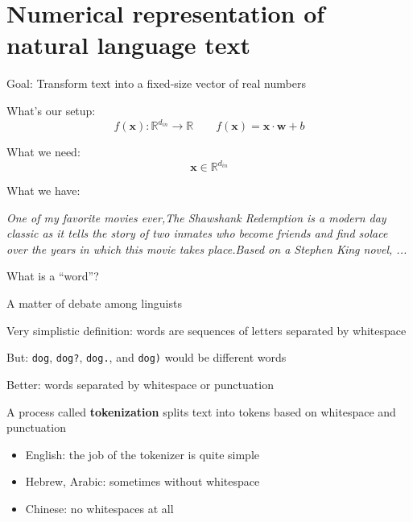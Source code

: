 \documentclass[12pt,aspectratio=169,handout]{beamer}
\begin{document}
\section{Numerical representation of natural language text}


\begin{frame}{Goal: Transform text into a fixed-size vector of real numbers}

What's our setup:
$$f(\bm{x}) : \mathbb{R}^{d_{in}} \to \mathbb{R} \qquad
f(\bm{x}) = \bm{x} \cdot \bm{w} + b$$

What we need:
$$\bm{x} \in \mathbb{R}^{d_{in}}$$

\pause
What we have:

\emph{One of my favorite movies ever,The Shawshank Redemption is a modern day classic as it tells the story of two inmates who become friends and find solace over the years in which this movie takes place.Based on a Stephen King novel, ...}

\end{frame}


\begin{frame}{What is a ``word''?}

A matter of debate among linguists

Very simplistic definition: words are sequences of letters separated by whitespace

But: \texttt{dog}, \texttt{dog?}, \texttt{dog.}, and \texttt{dog)} would be different words

Better: words separated by whitespace or punctuation

A process called \textbf{tokenization} splits text into tokens based on whitespace and punctuation

\begin{itemize}
	\item English: the job of the tokenizer is quite simple
	\item Hebrew, Arabic: sometimes without whitespace
	\item Chinese: no whitespaces at all
\end{itemize}



\end{frame}
\end{document}
